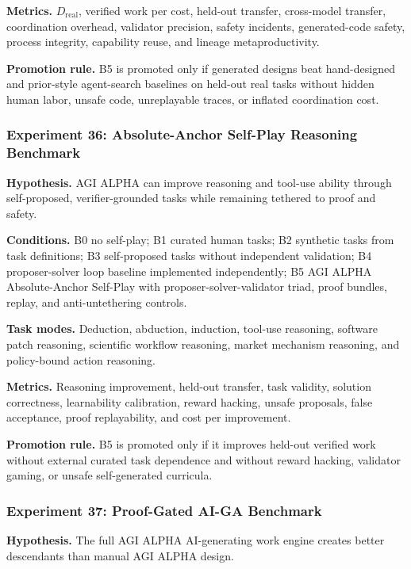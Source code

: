 \documentclass[
  11pt,
]{article}
\begin{document}
\textbf{Metrics.} \(D_{\mathrm{real}}\), verified work per cost,
held-out transfer, cross-model transfer, coordination overhead,
validator precision, safety incidents, generated-code safety, process
integrity, capability reuse, and lineage metaproductivity.

\textbf{Promotion rule.} B5 is promoted only if generated designs beat
hand-designed and prior-style agent-search baselines on held-out real
tasks without hidden human labor, unsafe code, unreplayable traces, or
inflated coordination cost.

\subsubsection{Experiment 36: Absolute-Anchor Self-Play Reasoning
Benchmark}\label{experiment-36-absolute-anchor-self-play-reasoning-benchmark}

\textbf{Hypothesis.} AGI ALPHA can improve reasoning and tool-use
ability through self-proposed, verifier-grounded tasks while remaining
tethered to proof and safety.

\textbf{Conditions.} B0 no self-play; B1 curated human tasks; B2
synthetic tasks from task definitions; B3 self-proposed tasks without
independent validation; B4 proposer-solver loop baseline implemented
independently; B5 AGI ALPHA Absolute-Anchor Self-Play with
proposer-solver-validator triad, proof bundles, replay, and
anti-untethering controls.

\textbf{Task modes.} Deduction, abduction, induction, tool-use
reasoning, software patch reasoning, scientific workflow reasoning,
market mechanism reasoning, and policy-bound action reasoning.

\textbf{Metrics.} Reasoning improvement, held-out transfer, task
validity, solution correctness, learnability calibration, reward
hacking, unsafe proposals, false acceptance, proof replayability, and
cost per improvement.

\textbf{Promotion rule.} B5 is promoted only if it improves held-out
verified work without external curated task dependence and without
reward hacking, validator gaming, or unsafe self-generated curricula.

\subsubsection{Experiment 37: Proof-Gated AI-GA
Benchmark}\label{experiment-37-proof-gated-ai-ga-benchmark}

\textbf{Hypothesis.} The full AGI ALPHA AI-generating work engine
creates better descendants than manual AGI ALPHA design.
\end{document}
